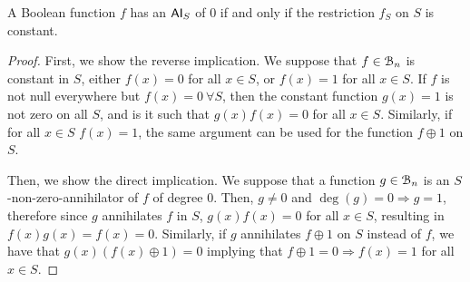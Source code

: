 \documentclass[11pt]{llncs}
\begin{document}
\begin{proposition}\label{prop:constantFs}
	A Boolean function $f$ has an $\mathsf{AI}_S$ of $0$ if and only if the restriction $f_S$ on $S$ is constant.
\end{proposition}
\begin{proof}
	First, we show the reverse implication.
	We suppose that $f\in \mathcal{B}_n$ is constant in $S$, either $f(x) = 0$ for all $x\in S$, or $f(x) = 1$ for all $x\in S$.
	If $f$ is not null everywhere but $f(x) = 0\ \forall S$, then the constant function $g(x) = 1$ is not zero on all $S$, and is it such that $g(x)f(x) = 0$ for all $x\in S$. 
	Similarly, if for all $x\in S$ $f(x) = 1$, the same argument can be used for the function $f\oplus 1$ on $S$.
	
	Then, we show the direct implication.
	We suppose that a function $g\in \mathcal{B}_n$ is an $S$-non-zero-annihilator of $f$ of degree $0$. Then,
	$g \neq 0$ and $\deg(g) = 0 \Rightarrow g = 1$, therefore since $g$ annihilates $f$ in $S$,  $g(x) f(x) = 0$ for all $x \in S$, resulting in $f(x)g(x) = f(x) = 0$.
	Similarly, if $g$ annihilates $f\oplus 1$ on $S$ instead of $f$, we have that $g(x)(f(x) \oplus 1) = 0$ implying that $f\oplus 1 = 0 \Rightarrow f(x) = 1$ for all $x\in S$. 
\end{proof}
\end{document}
